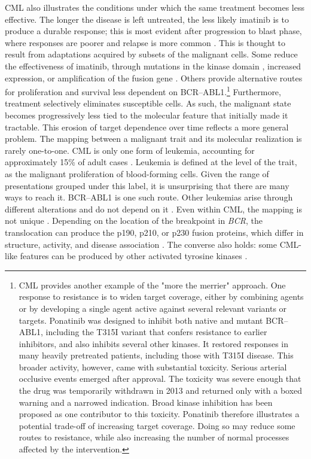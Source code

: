 \documentclass[twocolumn]{article} %
\begin{document}
CML also illustrates the conditions under which the same treatment becomes less effective. The longer the disease is left untreated, the less likely imatinib is to produce a durable response; this is most evident after progression to blast phase, where responses are poorer and relapse is more common \cite{weisberg2007second, druker2025imatinib}. This is thought to result from adaptations acquired by subsets of the malignant cells. Some reduce the effectiveness of imatinib, through mutations in the kinase domain \citep[b]{weisberg2007second}\citep[c]{druker2025imatinib}, increased expression, or amplification of the fusion gene \cite{hochhaus2004clinical, volpe2009imatinib}. Others provide alternative routes for proliferation and survival less dependent on BCR–ABL1.\footnote{CML provides another example of the "more the merrier" approach. One response to resistance is to widen target coverage, either by combining agents or by developing a single agent active against several relevant variants or targets. Ponatinib was designed to inhibit both native and mutant BCR--ABL1, including the T315I variant that confers resistance to earlier inhibitors, and also inhibits several other kinases. It restored responses in many heavily pretreated patients, including those with T315I disease. This broader activity, however, came with substantial toxicity. Serious arterial occlusive events emerged after approval. The toxicity was severe enough that the drug was temporarily withdrawn in 2013 and returned only with a boxed warning and a narrowed indication. Broad kinase inhibition has been proposed as one contributor to this toxicity. Ponatinib therefore illustrates a potential trade-off of increasing target coverage. Doing so may reduce some routes to resistance, while also increasing the number of normal processes affected by the intervention.} Furthermore, treatment selectively eliminates susceptible cells. As such, the malignant state becomes progressively less tied to the molecular feature that initially made it tractable. This erosion of target dependence over time reflects a more general problem. The mapping between a malignant trait and its molecular realization is rarely one-to-one. CML is only one form of leukemia, accounting for approximately 15\% of adult cases \cite{granatowicz2015overview}. Leukemia is defined at the level of the trait, as the malignant proliferation of blood-forming cells. Given the range of presentations grouped under this label, it is unsurprising that there are many ways to reach it. BCR–ABL1 is one such route. Other leukemias arise through different alterations and do not depend on it \citep[b]{pane1996neutrophilic}. Even within CML, the mapping is not unique \citep[c]{weisberg2007second}. Depending on the location of the breakpoint in \textit{BCR}, the translocation can produce the p190, p210, or p230 fusion proteins, which differ in structure, activity, and disease association \citep[a]{lugo1990tyrosine}\citep[c]{pane1996neutrophilic}. The converse also holds: some CML-like features can be produced by other activated tyrosine kinases \citep[b]{wedelin1986clinical}\cite{scott1991v}\cite{daley1990induction}\cite{kelliher1990induction}.
\end{document}
